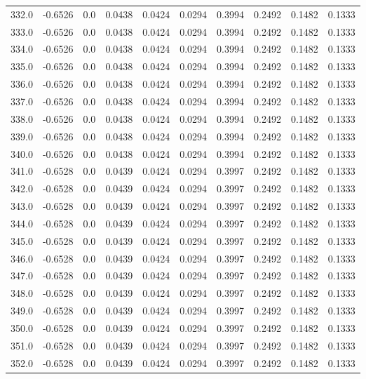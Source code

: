 \begin{longtable}{lrrrrrrrrr}
332.0 & -0.6526 & 0.0 & 0.0438 & 0.0424 & 0.0294 & 0.3994 & 0.2492 & 0.1482 & 0.1333 \\
333.0 & -0.6526 & 0.0 & 0.0438 & 0.0424 & 0.0294 & 0.3994 & 0.2492 & 0.1482 & 0.1333 \\
334.0 & -0.6526 & 0.0 & 0.0438 & 0.0424 & 0.0294 & 0.3994 & 0.2492 & 0.1482 & 0.1333 \\
335.0 & -0.6526 & 0.0 & 0.0438 & 0.0424 & 0.0294 & 0.3994 & 0.2492 & 0.1482 & 0.1333 \\
336.0 & -0.6526 & 0.0 & 0.0438 & 0.0424 & 0.0294 & 0.3994 & 0.2492 & 0.1482 & 0.1333 \\
337.0 & -0.6526 & 0.0 & 0.0438 & 0.0424 & 0.0294 & 0.3994 & 0.2492 & 0.1482 & 0.1333 \\
338.0 & -0.6526 & 0.0 & 0.0438 & 0.0424 & 0.0294 & 0.3994 & 0.2492 & 0.1482 & 0.1333 \\
339.0 & -0.6526 & 0.0 & 0.0438 & 0.0424 & 0.0294 & 0.3994 & 0.2492 & 0.1482 & 0.1333 \\
340.0 & -0.6526 & 0.0 & 0.0438 & 0.0424 & 0.0294 & 0.3994 & 0.2492 & 0.1482 & 0.1333 \\
341.0 & -0.6528 & 0.0 & 0.0439 & 0.0424 & 0.0294 & 0.3997 & 0.2492 & 0.1482 & 0.1333 \\
342.0 & -0.6528 & 0.0 & 0.0439 & 0.0424 & 0.0294 & 0.3997 & 0.2492 & 0.1482 & 0.1333 \\
343.0 & -0.6528 & 0.0 & 0.0439 & 0.0424 & 0.0294 & 0.3997 & 0.2492 & 0.1482 & 0.1333 \\
344.0 & -0.6528 & 0.0 & 0.0439 & 0.0424 & 0.0294 & 0.3997 & 0.2492 & 0.1482 & 0.1333 \\
345.0 & -0.6528 & 0.0 & 0.0439 & 0.0424 & 0.0294 & 0.3997 & 0.2492 & 0.1482 & 0.1333 \\
346.0 & -0.6528 & 0.0 & 0.0439 & 0.0424 & 0.0294 & 0.3997 & 0.2492 & 0.1482 & 0.1333 \\
347.0 & -0.6528 & 0.0 & 0.0439 & 0.0424 & 0.0294 & 0.3997 & 0.2492 & 0.1482 & 0.1333 \\
348.0 & -0.6528 & 0.0 & 0.0439 & 0.0424 & 0.0294 & 0.3997 & 0.2492 & 0.1482 & 0.1333 \\
349.0 & -0.6528 & 0.0 & 0.0439 & 0.0424 & 0.0294 & 0.3997 & 0.2492 & 0.1482 & 0.1333 \\
350.0 & -0.6528 & 0.0 & 0.0439 & 0.0424 & 0.0294 & 0.3997 & 0.2492 & 0.1482 & 0.1333 \\
351.0 & -0.6528 & 0.0 & 0.0439 & 0.0424 & 0.0294 & 0.3997 & 0.2492 & 0.1482 & 0.1333 \\
352.0 & -0.6528 & 0.0 & 0.0439 & 0.0424 & 0.0294 & 0.3997 & 0.2492 & 0.1482 & 0.1333 \\

\end{longtable}
